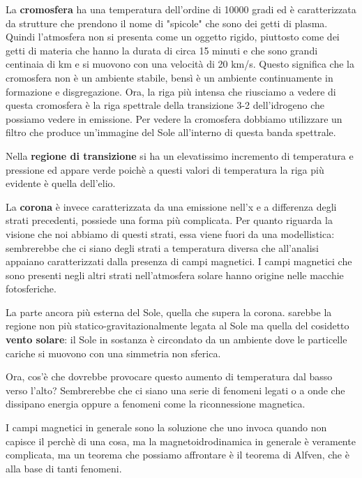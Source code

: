 \documentclass[a4paper,11pt]{article}
\begin{document}
La \textbf{cromosfera} ha una temperatura dell'ordine di 10000 gradi ed è caratterizzata da strutture che prendono il nome di "spicole" che sono dei getti di plasma. Quindi l'atmosfera non si presenta come un oggetto rigido, piuttosto come dei getti di materia che hanno la durata di circa 15 minuti e che sono grandi centinaia di km e si muovono con una velocità di 20 km/s. Questo significa che la cromosfera non è un ambiente stabile, bensì è un ambiente continuamente in formazione e disgregazione.
Ora, la riga più intensa che riusciamo a vedere di questa cromosfera è la riga spettrale della transizione 3-2 dell'idrogeno che possiamo vedere in emissione. Per vedere la cromosfera dobbiamo utilizzare un filtro che produce un'immagine del Sole all'interno di questa banda spettrale.


Nella \textbf{regione di transizione}  si ha un elevatissimo incremento di temperatura e pressione ed appare verde poichè a questi valori di temperatura la riga più evidente è quella dell'elio.

La \textbf{corona} è invece caratterizzata da una emissione nell'x e a differenza degli strati precedenti, possiede una forma più complicata. Per quanto riguarda la visione che noi abbiamo di questi strati, essa viene fuori da una modellistica: sembrerebbe che ci siano degli strati a temperatura diversa che all'analisi appaiano caratterizzati dalla presenza di campi magnetici. I campi magnetici che sono presenti negli altri strati nell'atmosfera solare hanno origine nelle macchie fotosferiche.

La parte ancora più esterna del Sole, quella che supera la corona. sarebbe la regione non più statico-gravitazionalmente legata al Sole ma quella del cosidetto \textbf{vento solare}: il Sole in sostanza è circondato da un ambiente dove le particelle cariche si muovono con una simmetria non sferica.

Ora, cos'è che dovrebbe provocare questo aumento di temperatura dal basso verso l'alto? Sembrerebbe che ci siano una serie di fenomeni legati o a onde che dissipano energia oppure a fenomeni come la riconnessione magnetica.

I campi magnetici in generale sono la soluzione che uno invoca quando non capisce il perchè di una cosa, ma la magnetoidrodinamica in generale è veramente complicata, ma un teorema che possiamo affrontare è il teorema di Alfven, che è alla base di tanti fenomeni.
\end{document}
